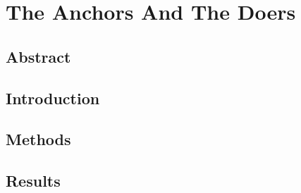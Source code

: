 
\chapter{The Anchors And The Doers} %
\section{Abstract}
\section{Introduction}
\section{Methods}
\section{Results}
